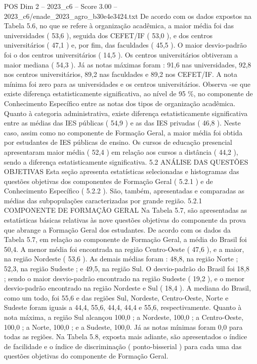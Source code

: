 \begin{textsample}{POS Dim 2 – 2023\_c6 – Score 3.00 – 2023\_c6/enade\_2023\_agro\_b30e4e3424.txt}
De acordo com os dados expostos na Tabela 5.6, no que se refere à organização acadêmica, a maior média foi das universidades ( 53,6 ), seguida dos CEFET/IF ( 53,0 ), e dos centros universitários ( 47,1 ) e, por fim, das faculdades ( 45,5 ).
O maior desvio-padrão foi o dos centros universitários ( 14,5 ).
Os centros universitários obtiveram a maior mediana ( 54,3 ).
Já as notas máximas foram : 91,6 nas universidades, 92,8 nos centros universitários, 89,2 nas faculdades e 89,2 nos CEFET/IF.
A nota mínima foi zero para as universidades e os centros universitários.
Observa -se que existe diferença estatisticamente significativa, ao nível de 95 \%, no componente de Conhecimento Específico entre as notas dos tipos de organização acadêmica.
Quanto à categoria administrativa, existe diferença estatisticamente significativa entre as médias das IES públicas ( 54,9 ) e as das IES privadas ( 46,8 ).
Neste caso, assim como no componente de Formação Geral, a maior média foi obtida por estudantes de IES públicas de ensino.
Os cursos de educação presencial apresentaram maior média ( 52,4 ) em relação aos cursos a distância ( 44,2 ), sendo a diferença estatisticamente significativa. 5.2 ANÁLISE DAS QUESTÕES OBJETIVAS Esta seção apresenta estatísticas selecionadas e histogramas das questões objetivas dos componentes de Formação Geral ( 5.2.1 ) e de Conhecimento Específico ( 5.2.2 ).
São, também, apresentadas e comparadas as médias das subpopulações caracterizadas por grande região. 5.2.1 COMPONENTE DE FORMAÇÃO GERAL Na Tabela 5.7, são apresentadas as estatísticas básicas relativas às nove questões objetivas do componente da prova que abrange a Formação Geral dos estudantes.
De acordo com os dados da Tabela 5.7, em relação ao componente de Formação Geral, a média do Brasil foi 50,4.
A menor média foi encontrada na região Centro-Oeste ( 47,6 ), e a maior, na região Nordeste ( 53,6 ).
As demais médias foram : 48,8, na região Norte ; 52,3, na região Sudeste ; e 49,5, na região Sul.
O desvio-padrão do Brasil foi 18,8 ; sendo o maior desvio-padrão encontrado na região Sudeste ( 19,2 ), e o menor desvio-padrão encontrado na região Nordeste e Sul ( 18,4 ).
A mediana do Brasil, como um todo, foi 55,6 e das regiões Sul, Nordeste, Centro-Oeste, Norte e Sudeste foram iguais a 44,4, 55,6, 44,4, 44,4 e 55,6, respectivamente.
Quanto à nota máxima, a região Sul alcançou 100,0 ; a Nordeste, 100,0 ; a Centro-Oeste, 100,0 ; a Norte, 100,0 ; e a Sudeste, 100,0.
Já as notas mínimas foram 0,0 para todas as regiões.
Na Tabela 5.8, exposta mais adiante, são apresentados o índice de facilidade e o índice de discriminação ( ponto-bisserial ) para cada uma das questões objetivas do componente de Formação Geral.

\end{textsample}
